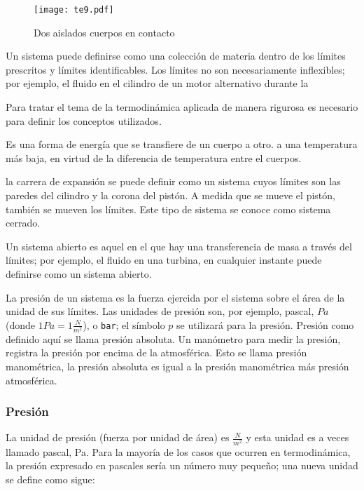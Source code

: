 \begin{figure}[h!]
    \centering
    \texttt{[image: te9.pdf]}
    \caption{Dos aislados cuerpos en contacto}
    \label{te9}
  \end{figure}

Un sistema puede definirse como una colección de materia dentro de los límites prescritos y
límites identificables. Los límites no son necesariamente inflexibles;
por ejemplo, el fluido en el cilindro de un motor alternativo durante la

Para tratar el tema de la termodinámica aplicada de manera rigurosa es
necesario para definir los conceptos utilizados.

\begin{definition}[Calor]
    Es una forma de energía que se transfiere de un cuerpo a otro.
a una temperatura más baja, en virtud de la diferencia de temperatura entre el
cuerpos.
\end{definition}

la carrera de expansión se puede definir como un sistema cuyos límites son las paredes del cilindro
y la corona del pistón. A medida que se mueve el pistón, también se mueven los límites.
Este tipo de sistema se conoce como sistema cerrado.

Un sistema abierto es aquel en el que hay una transferencia de masa a través del
límites; por ejemplo, el fluido en una turbina, en cualquier instante puede definirse
como un sistema abierto.

La presión de un sistema es la fuerza ejercida por el sistema sobre el área de la unidad
de sus límites. Las unidades de presión son, por ejemplo, pascal, $Pa$ (donde
$1 Pa = 1 \frac{N}{m^2}$), o \texttt{bar}; el símbolo $p$ se utilizará para la presión. Presión como
definido aquí se llama presión absoluta. Un manómetro para medir la presión,
registra la presión por encima de la atmosférica. Esto
se llama presión manométrica, la presión absoluta es igual a la presión manométrica más
presión atmosférica.

\subsubsection{Presión}

La unidad de presión (fuerza por unidad de área) es $\frac{N}{m^2}$ y esta unidad es a veces
llamado pascal, Pa. Para la mayoría de los casos que ocurren en termodinámica, la presión
expresado en pascales sería un número muy pequeño; una nueva unidad se define como
sigue:

